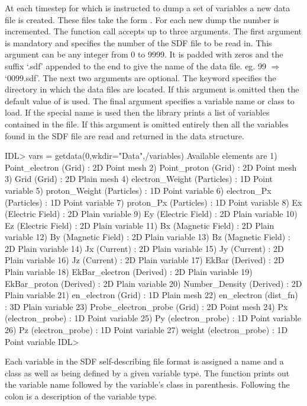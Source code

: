   At each timestep for which {\EPOCH} is instructed to dump a set of variables a
  new data file is created. These files take the form . For
  each new dump the number is incremented.
  The function call accepts up to three arguments. The first argument is
  mandatory and specifies the number of the SDF file to be read in.
  This argument can be any integer from 0 to 9999.
  It is padded with zeros and the
  suffix `.sdf' appended to the end to give the name of the data file.
  eg. 99 $\Rightarrow$ `0099.sdf'. The next two arguments are optional.
  The keyword  specifies the directory in which the data files
  are located. If this argument is omitted then the default value of
   is used. The final argument specifies a variable name or class
  to load. If the special name  is used then the library
  prints a list of variables contained in the file.
  If this argument is omitted entirely then all the variables found in
  the SDF file are read and returned in the data structure.

\begin{boxverbatim}
IDL> vars = getdata(0,wkdir="Data",/variables)
Available elements are
1) Point_electron (Grid) : 2D Point mesh
2) Point_proton (Grid) : 2D Point mesh
3) Grid (Grid) : 2D Plain mesh
4) electron_Weight (Particles) : 1D Point variable
5) proton_Weight (Particles) : 1D Point variable
6) electron_Px (Particles) : 1D Point variable
7) proton_Px (Particles) : 1D Point variable
8) Ex (Electric Field) : 2D Plain variable
9) Ey (Electric Field) : 2D Plain variable
10) Ez (Electric Field) : 2D Plain variable
11) Bx (Magnetic Field) : 2D Plain variable
12) By (Magnetic Field) : 2D Plain variable
13) Bz (Magnetic Field) : 2D Plain variable
14) Jx (Current) : 2D Plain variable
15) Jy (Current) : 2D Plain variable
16) Jz (Current) : 2D Plain variable
17) EkBar (Derived) : 2D Plain variable
18) EkBar_electron (Derived) : 2D Plain variable
19) EkBar_proton (Derived) : 2D Plain variable
20) Number_Density (Derived) : 2D Plain variable
21) en_electron (Grid) : 1D Plain mesh
22) en_electron (dist_fn) : 3D Plain variable
23) Probe_electron_probe (Grid) : 2D Point mesh
24) Px (electron_probe) : 1D Point variable
25) Py (electron_probe) : 1D Point variable
26) Pz (electron_probe) : 1D Point variable
27) weight (electron_probe) : 1D Point variable
IDL>
\end{boxverbatim}

  Each variable in the SDF self-describing file format is assigned a
  name and a class as well as being defined by a given variable type.
  The  function prints out the variable name followed
  by the variable's class in parenthesis. Following the colon is a
  description of the variable type.

